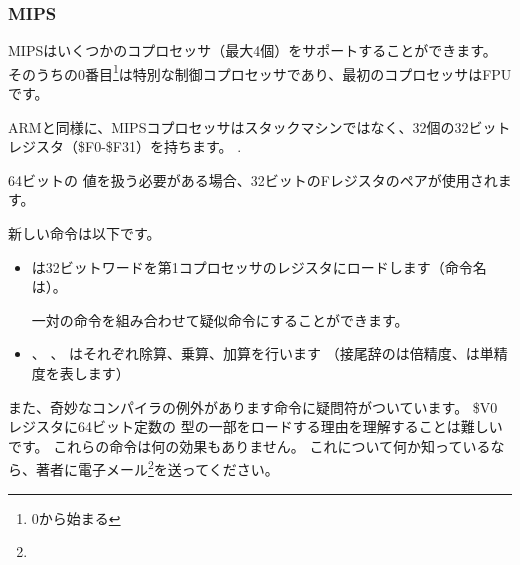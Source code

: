 ﻿\subsubsection{MIPS}

MIPSはいくつかのコプロセッサ（最大4個）をサポートすることができます。
そのうちの0番目\footnote{0から始まる}は特別な制御コプロセッサであり、最初のコプロセッサはFPUです。

ARMと同様に、MIPSコプロセッサはスタックマシンではなく、32個の32ビットレジスタ（\$F0-\$F31）を持ちます。
.

64ビットの \Tdouble 値を扱う必要がある場合、32ビットのFレジスタのペアが使用されます。



新しい命令は以下です。

\begin{itemize}

\item {}は32ビットワードを第1コプロセッサのレジスタにロードします（命令名は）。

一対の命令を組み合わせて疑似命令にすることができます。

\item {}、 、 はそれぞれ除算、乗算、加算を行います
（接尾辞のは倍精度、は単精度を表します）

\end{itemize}

\myindex{\CompilerAnomaly}
\label{MIPS_FPU_LUI}

また、奇妙なコンパイラの例外があります命令に疑問符がついています。 
\$V0 レジスタに64ビット定数の \Tdouble 型の一部をロードする理由を理解することは難しいです。 
これらの命令は何の効果もありません。 
これについて何か知っているなら、著者に電子メール\footnote{\EMAIL}を送ってください。
